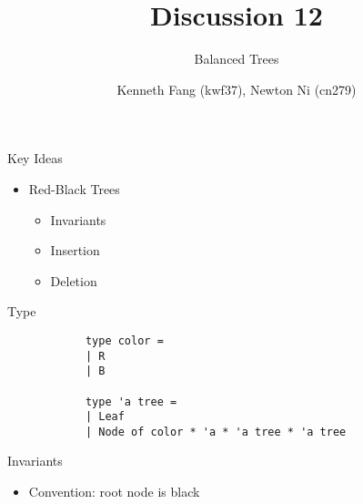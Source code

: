 \documentclass{beamer}
\title{Discussion 12}
\subtitle{Balanced Trees}
\author{Kenneth Fang (kwf37), Newton Ni (cn279)}
\begin{document}
    \begin{frame}
        \titlepage{}
    \end{frame}
    
    \begin{frame}{Key Ideas}
        \begin{itemize}
            \item<1-> Red-Black Trees
            \begin{itemize}
                \item<2-> Invariants
                \item<3-> Insertion
                \item<4-> Deletion
            \end{itemize}
        \end{itemize}
    \end{frame}

    \begin{frame}[fragile=singleslide]{Type}
        \begin{verbatim}
            type color =
            | R
            | B

            type 'a tree =
            | Leaf
            | Node of color * 'a * 'a tree * 'a tree
        \end{verbatim} 
    \end{frame}

    \begin{frame}{Invariants}
        \begin{itemize}
            \item Convention: root node is black
        \end{itemize} 
    \end{frame}

    \begin{frame}
        \begin{figure}
        \end{figure}
    \end{frame}
\end{document}

